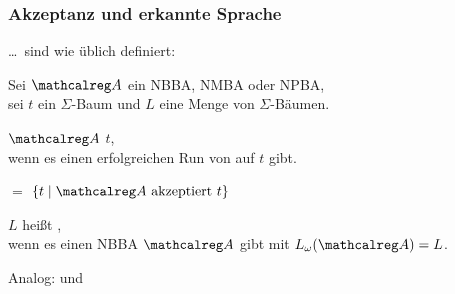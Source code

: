 \begin{frame}
  \frametitle{Akzeptanz und erkannte Sprache}

  \dots\ sind wie üblich definiert:

  \par\bigskip
  \begin{Definition}
    Sei $\Aut{A}$ ein NBBA, NMBA oder NPBA,\\
    sei $t$ ein $\Sigma$-Baum und $L$ eine Menge von $\Sigma$-Bäumen.
    \begin{Itemize}
      \item
        $\Aut{A}$  $t$,\\
        wenn es einen erfolgreichen Run von  auf $t$ gibt.
        \par\smallskip
      \item
         $=$ $\{t \mid \Aut{A} \text{~akzeptiert~} t\}$
        \par\bigskip
      \item
        $L$ heißt ,\\
        wenn es einen NBBA $\Aut{A}$ gibt mit $L_\omega(\Aut{A})=L$.
        \par\smallskip
      \item
        Analog:  und 
    \end{Itemize}
  \end{Definition}

\end{frame}

